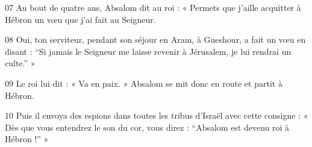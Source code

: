 
07 Au bout de quatre ans, Absalom dit au roi : « Permets que j’aille acquitter à Hébron un vœu que j’ai fait au Seigneur.

08 Oui, ton serviteur, pendant son séjour en Aram, à Gueshour, a fait un vœu en disant : “Si jamais le Seigneur me laisse revenir à Jérusalem, je lui rendrai un culte.” »

09 Le roi lui dit : « Va en paix. » Absalom se mit donc en route et partit à Hébron.

10 Puis il envoya des espions dans toutes les tribus d’Israël avec cette consigne : « Dès que vous entendrez le son du cor, vous direz : “Absalom est devenu roi à Hébron !” »